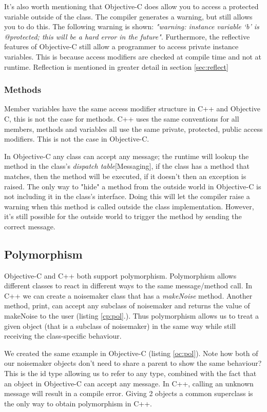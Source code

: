 \documentclass[12pt, a4paper, twocolumn]{article}
\begin{document}
It's also worth mentioning that Objective-C does allow you to access a protected variable outside of the class. The compiler generates a warning, but still allows you to do this. The following warning is shown: 
\textit{"warning: instance variable ‘b’ is @protected; this will be a hard error in the future"}.
Furthermore, the reflective features of Objective-C still allow a programmer to access private instance variables. This is because access modifiers are checked at compile time and not at runtime. Reflection is mentioned in greater detail in section \ref{sec:reflect}

\subsubsection{Methods}
Member variables have the same access modifier structure in C++ and Objective C, this is not the case for methods. C++ uses the same conventions for all members, methods and variables all use the same private, protected, public access modifiers. This is not the case in Objective-C. 

In Objective-C any class can accept any message; the runtime will lookup the method in the class's \textit{dispatch table}\cite{OCRPG}[Messaging], if the class has a method that matches, then the method will be executed, if it doesn't then an exception is raised. The only way to "hide" a method from the outside world in Objective-C is not including it in the class's interface. Doing this will let the compiler raise a warning when this method is called outside the class implementation. However, it's still possible for the outside world to trigger the method by sending the correct message.

\subsection{Polymorphism}
\label{sec:polymorphism}

Objective-C and C++ both support polymorphism. Polymorphism allows different classes to react in different ways to the same message/method call. In C++ we can create a noisemaker class that has a \textit{makeNoise} method. Another method, print, can accept any subclass of noisemaker and returns the value of makeNoise to the user (listing \ref{cp:pol}.). 
Thus polymorphism allows us to treat a given object (that is a subclass of noisemaker) in the same way while still receiving the class-specific behaviour.

We created the same example in Objective-C (listing \ref{oc:pol}). Note how both of our noisemaker objects don't need to share a parent to show the same behaviour? This is the id type allowing us to refer to any type, combined with the fact that an object in Objective-C can accept any message. In C++, calling an unknown message will result in a compile error. Giving 2 objects a common superclass is the only way to obtain polymorphism in C++. 
\end{document}
